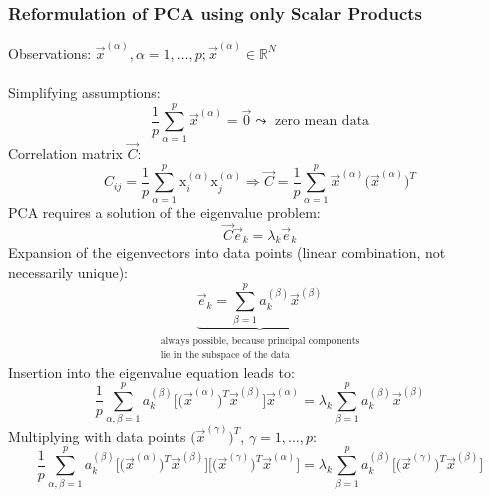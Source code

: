 \subsubsection{Reformulation of PCA using only Scalar Products}
Observations: $\vec{x}^{(\alpha)}, \alpha = 1, \ldots, p; \vec{x}^{(\alpha)} \in \mathbb{R}^N$
\\\\
Simplifying assumptions:
\begin{equation}
	\frac{1}{p} \sum\limits_{\alpha = 1}^p \vec{x}^{(\alpha)} = \vec{0}
		\leadsto \text{ zero mean data}
\end{equation}
Correlation matrix $\vec{C}$:
\begin{equation}
	C_{ij} = \frac{1}{p} \sum\limits_{\alpha = 1}^p \mathrm{x}_i^{(\alpha)}
		\mathrm{x}_j^{(\alpha)} 
		\Rightarrow \vec{C} = \frac{1}{p} \sum\limits_{\alpha = 1}^p
			\vec{x}^{(\alpha)} \Big( \vec{x}^{(\alpha)} \Big)^T
\end{equation}
PCA requires a solution of the eigenvalue problem:
\begin{equation}
	\vec{C} \vec{e}_k = \lambda_k \vec{e}_k
\end{equation}
Expansion of the eigenvectors into data points (linear combination, not necessarily unique):
\begin{equation}
	\underbrace{ \vec{e}_k = \sum\limits_{\beta = 1}^p a_k^{(\beta)} 
		\vec{x}^{(\beta)}
	}_{ \substack{	\text{always possible, because principal 
					components}\\
				\text{lie in the subspace of the data} } }
\end{equation}
Insertion into the eigenvalue equation leads to:
\begin{equation}
	\frac{1}{p} \sum\limits_{\alpha, \beta = 1}^p a_k^{(\beta)}
	\bigg[ \Big( \vec{x}^{(\alpha)} \Big)^T \vec{x}^{(\beta)} \bigg]
	\vec{x}^{(\alpha)} = \lambda_k \sum\limits_{\beta = 1}^p
	a_k^{(\beta)} \vec{x}^{(\beta)}
\end{equation}
Multiplying with data points $\Big( \vec{x}^{(\gamma)} \Big)^T$, $\gamma = 1,\dots,p$:
\begin{equation}
	\frac{1}{p} \sum\limits_{\alpha, \beta = 1}^p a_k^{(\beta)}
	\bigg[ \Big( \vec{x}^{(\alpha)} \Big)^T \vec{x}^{(\beta)} \bigg]
	\bigg[ \Big( \vec{x}^{(\gamma)} \Big)^T \vec{x}^{(\alpha)} \bigg]
	= \lambda_k \sum\limits_{\beta = 1}^p a_k^{(\beta)} 
	\bigg[ \Big( \vec{x}^{(\gamma)} \Big)^T \vec{x}^{(\beta)} \bigg]
\end{equation}
